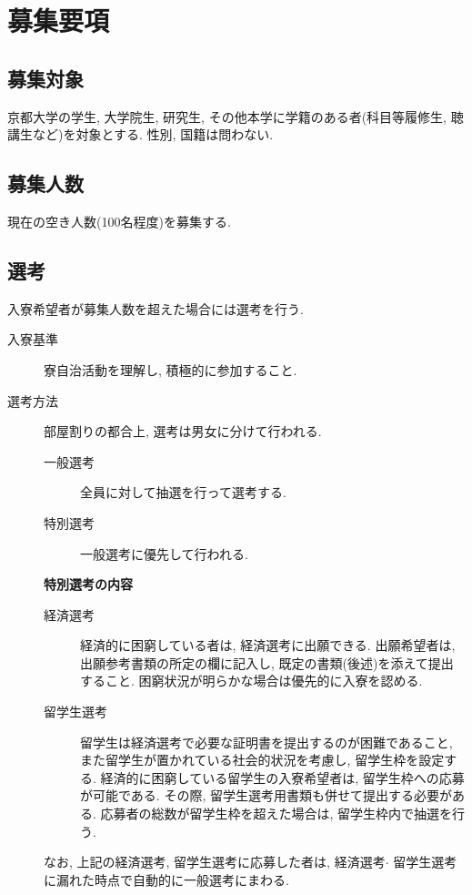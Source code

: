 \documentclass[10pt,b5jsbook,dvips,dvipdfmx,openany]{jsbook}
\theoremstyle{definition}
\begin{document}

\newpage
	\section{募集要項} \label{sec:gl}
		\subsection{募集対象}
		京都大学の学生, 大学院生, 研究生, その他本学に学籍のある者(科目等履修生, 聴講生など)を対象とする. 性別, 国籍は問わない.

		\subsection{募集人数}
		現在の空き人数(100名程度)を募集する.

		\subsection{選考}
		入寮希望者が募集人数を超えた場合には選考を行う.
		\begin{description}
		\item[入寮基準]
		寮自治活動を理解し, 積極的に参加すること.
		\item[選考方法]
		部屋割りの都合上, 選考は男女に分けて行われる.
			\begin{description}
			\item[一般選考]全員に対して抽選を行って選考する.
			\item[特別選考] 一般選考に優先して行われる.
	\end{description}
	\begin{itembox}[l]{\bf 特別選考の内容}

		\begin{description}
		\item[経済選考] 経済的に困窮している者は, 経済選考に出願できる. 出願希望者は, 出願参考書類の所定の欄に記入し, 既定の書類(後述)を添えて提出すること. 困窮状況が明らかな場合は優先的に入寮を認める.
		\item[留学生選考] 留学生は経済選考で必要な証明書を提出するのが困難であること, また留学生が置かれている社会的状況を考慮し, 留学生枠を設定する. 経済的に困窮している留学生の入寮希望者は, 留学生枠への応募が可能である. その際, 留学生選考用書類も併せて提出する必要がある. 応募者の総数が留学生枠を超えた場合は, 留学生枠内で抽選を行う.
		\end{description}

なお, 上記の経済選考, 留学生選考に応募した者は, 経済選考$ \cdot $ 留学生選考に漏れた時点で自動的に一般選考にまわる.

	\end{itembox}

	\end{description}
\end{document}
